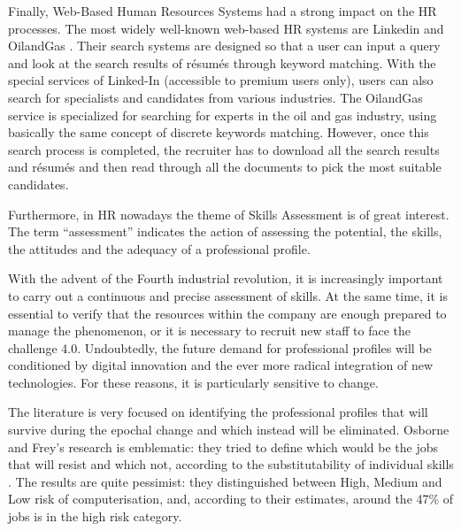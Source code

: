 \documentclass[]{book}
\begin{document}
Finally, Web-Based Human Resources Systems had a strong impact on the HR
processes. The most widely well-known web-based HR systems are Linkedin
and OilandGas \citep{walker2001web}. Their search systems are designed
so that a user can input a query and look at the search results of
résumés through keyword matching. With the special services of Linked-In
(accessible to premium users only), users can also search for
specialists and candidates from various industries. The OilandGas
service is specialized for searching for experts in the oil and gas
industry, using basically the same concept of discrete keywords
matching. However, once this search process is completed, the recruiter
has to download all the search results and résumés and then read through
all the documents to pick the most suitable candidates.

Furthermore, in HR nowadays the theme of Skills Assessment is of great
interest. The term ``assessment'' indicates the action of assessing the
potential, the skills, the attitudes and the adequacy of a professional
profile.

With the advent of the Fourth industrial revolution, it is increasingly
important to carry out a continuous and precise assessment of skills. At
the same time, it is essential to verify that the resources within the
company are enough prepared to manage the phenomenon, or it is necessary
to recruit new staff to face the challenge 4.0. Undoubtedly, the future
demand for professional profiles will be conditioned by digital
innovation and the ever more radical integration of new technologies.
For these reasons, it is particularly sensitive to change.

The literature is very focused on identifying the professional profiles
that will survive during the epochal change and which instead will be
eliminated. Osborne and Frey's research is emblematic: they tried to
define which would be the jobs that will resist and which not, according
to the substitutability of individual skills \citep{frey2017future}. The
results are quite pessimist: they distinguished between High, Medium and
Low risk of computerisation, and, according to their estimates, around
the 47\% of jobs is in the high risk category.
\end{document}

